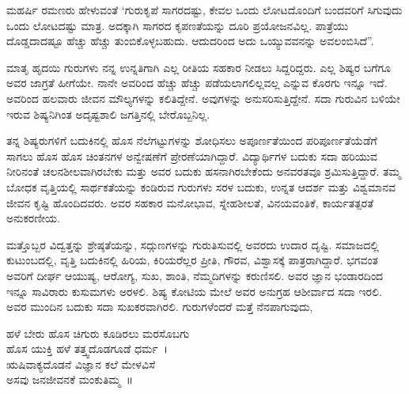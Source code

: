 {ಮಹರ್ಷಿ ರಮಣರು ಹೇಳುವಂತೆ ‘ಗುರುಕೃಪೆ ಸಾಗರದಷ್ಟು, ಕೇವಲ ಒಂದು ಲೋಟದೊಂದಿಗೆ ಬಂದವರಿಗೆ ಸಿಗುವುದು ಒಂದು ಲೋಟದಷ್ಟು ಮಾತ್ರ. ಅದಕ್ಕಾಗಿ ಸಾಗರದ ಕೃಪಣತೆಯನ್ನು ದೂರಿ ಪ್ರಯೋಜನವಿಲ್ಲ. ಪಾತ್ರೆಯು ದೊಡ್ಡದಾದಷ್ಟೂ ಹೆಚ್ಚು ಹೆಚ್ಚು ತುಂಬಿಕೊಳ್ಳಬಹುದು. ಆದುದರಿಂದ ಅದು ಒಯ್ಯುವವನನ್ನು ಅವಲಂಬಿಸಿದೆ”.

ಮಾತೃ ಹೃದಯಿ ಗುರುಗಳು ನನ್ನ ಉನ್ನತಿಗಾಗಿ ಎಲ್ಲ ರೀತಿಯ ಸಹಕಾರ ನೀಡಲು ಸಿದ್ದರಿದ್ದರು. ಎಲ್ಲ ಶಿಷ್ಯರ ಬಗೆಗೂ ಅವರ ಜಾಗ್ರತೆ ಹೀಗೆಯೇ. ನಾನೇ ಅವರಿಂದ ಹೆಚ್ಚು ಹೆಚ್ಚು ಪಡೆಯಲಾಗಲಿಲ್ಲವಲ್ಲ ಎನ್ನುವ ಕೊರಗು ಇನ್ನೂ ಇದೆ. ಅವರಿಂದ ಹಲವಾರು ಜೀವನ ಮೌಲ್ಯಗಳನ್ನು ಕಲಿತಿದ್ದೇನೆ. ಅವುಗಳನ್ನು ಅನುಸರಿಸುತ್ತಿದ್ದೇನೆ. ಸದಾ ಗುರುವಿನ ಬಳಿಯೇ ಇರುವ ಶಿಷ್ಯನಿಗಿಂತ ಅದೃಷ್ಟಶಾಲಿ ಜಗತ್ತಿನಲ್ಲಿ ಬೇರೊಬ್ಬನಿಲ್ಲ.

ತನ್ನ ಶಿಷ್ಯರುಗಳಿಗೆ ಬದುಕಿನಲ್ಲಿ ಹೊಸ ನೆಲೆಗಟ್ಟುಗಳನ್ನು ಶೋಧಿಸಲು ಅಪೂರ್ಣತೆಯಿಂದ ಪರಿಪೂರ್ಣತೆಯೆಡೆಗೆ ಸಾಗಲು ಹೊಸ ಹೊಸ ಚಿಂತನಗಳ ಅನ್ವೇಷಣೆಗೆ ಪ್ರೇರಣೆಯಾಗಿದ್ದಾರೆ. ವಿದ್ಯಾರ್ಥಿಗಳ ಬದುಕು ಸದಾ ಹರಿಯುವ ನೀರಿನಂತೆ ಚಲನಶೀಲವಾಗಿರಬೇಕು ಮತ್ತು ಅವರ ಬದುಕು ಹಸನಾಗಿರಬೇಕೆಂದು ಅನವರತವೂ ಶ್ರಮಿಸುತ್ತಿದ್ದಾರೆ. ತಮ್ಮ ಬೋಧಕ ವೃತ್ತಿಯಲ್ಲಿ ಸಾರ್ಥಕತೆಯನ್ನು ಕಂಡಿರುವ ಗುರುಗಳು ಸರಳ ಬದುಕು, ಉನ್ನತ ಆದರ್ಶ ಮತ್ತು ವಿಶ್ವಮಾನವ ಜೀವನ ಕೃಷ್ಟಿ ಹೊಂದಿದವರು. ಅವರ ಸಹಕಾರ ಮನೋಭಾವ, ಸ್ನೇಹಶೀಲತೆ, ವಿನಯವಂತಿಕೆ, ಕಾರ್ಯತತ್ಪರತೆ ಅನುಕರಣೀಯ.

ಮತ್ತೊಬ್ಬರ ವಿದ್ವತ್ತನ್ನು ಶ್ರೇಷ್ಠತೆಯನ್ನು, ಸದ್ಗುಣಗಳನ್ನು ಗುರುತಿಸುವಲ್ಲಿ ಅವರದು ಉದಾರ ದೃಷ್ಟಿ. ಸಮಾಜದಲ್ಲಿ ಕುಟುಂಬದಲ್ಲಿ, ವೃತ್ತಿ ಬದುಕಿನಲ್ಲಿ ಹಿರಿಯ, ಕಿರಿಯರೆಲ್ಲರ ಪ್ರೀತಿ, ಗೌರವ, ವಿಶ್ವಾಸಕ್ಕೆ ಪಾತ್ರರಾಗಿದ್ದಾರೆ. ಭಗವಂತ ಅವರಿಗೆ ದೀರ್ಘ ಆಯುಷ್ಯ, ಆರೋಗ್ಯ, ಸುಖ, ಶಾಂತಿ, ನೆಮ್ಮದಿಗಳನ್ನು ಕರುಣಿಸಲಿ. ಅವರ ಜ್ಞಾನ ಭಂಡಾರದಿಂದ ಇನ್ನೂ ಸಾವಿರಾರು ಕುಸುಮಗಳು ಅರಳಲಿ. ಶಿಷ್ಯ ಕೋಟಿಯ ಮೇಲೆ ಅವರ ಅನುಗ್ರಹ ಆಶೀರ್ವಾದ ಸದಾ ಇರಲಿ. ಅವರ ಮುಂದಿನ ಬದುಕು ಸದಾ ಸುಖಕರವಾಗಿರಲಿ. ಗುರುಗಳೆಂದರೆ ಮತ್ತೆ ನೆನಪಾಗುವುದು,
\begin{center}
ಹಳೆ ಬೇರು ಹೊಸ ಚಿಗುರು ಕೂಡಿರಲು ಮರಸೊಬಗು\\
ಹೊಸ ಯುಕ್ತಿ ಹಳೆ ತತ್ತ್ವದೊಡಗೂಡೆ ಧರ್ಮ~।\\
ಋಷಿವಾಕ್ಯದೊಡನೆ ವಿಜ್ಞಾನ ಕಲೆ ಮೇಳವಿಸೆ \\
ಅಸವು ಜನಜೀವನಕೆ   \enginline{-}   ಮಂಕುತಿಮ್ಮ~॥
\end{center}

\articleend
}
